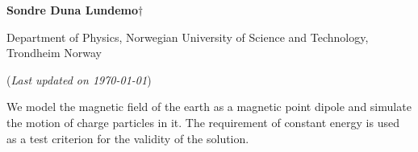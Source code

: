 


	
\begin{titlepage}
	\begin{center}
	\setlength{\parskip}{0em}
	\thispagestyle{titlepage}
	

	\vspace{4mm}
	
	\large{\textbf{Sondre Duna Lundemo}}$\dagger$
	
	\normalsize{Department of Physics, Norwegian University of Science and Technology, Trondheim Norway 
	}

	(\textit{Last updated on \today})
	\end{center}

	\setlength{\parindent}{2em}
	
	We model the magnetic field of the earth as a magnetic point dipole and simulate the motion of charge particles in it. The requirement of constant energy is used as a test criterion for the validity of the solution.
	
	\begin{figure}
		
	\end{figure}
	

\end{titlepage}

\setlength{\parskip}{1em}
\newpage









